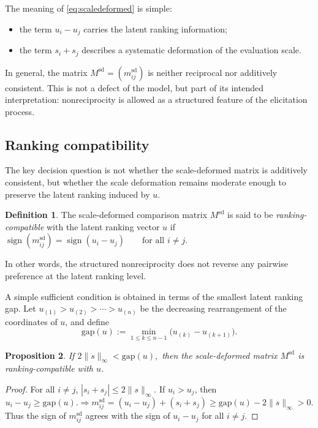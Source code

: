 \documentclass[11pt]{amsart}
\theoremstyle{definition}
\newtheorem{definition}{Definition}[section]
\theoremstyle{plain}
\newtheorem{proposition}[definition]{Proposition}
\numberwithin{equation}{section}
\begin{document}
The meaning of \eqref{eq:scaledeformed} is simple:
\begin{itemize}
\item the term $u_i-u_j$ carries the latent ranking information;
\item the term $s_i+s_j$ describes a systematic deformation of the evaluation scale.
\end{itemize}

In general, the matrix $M^{\mathrm{sd}}=(m_{ij}^{\mathrm{sd}})$ is neither reciprocal nor additively consistent. This is not a defect of the model, but part of its intended interpretation: nonreciprocity is allowed as a structured feature of the elicitation process.

\subsection{Ranking compatibility}

The key decision question is not whether the scale-deformed matrix is additively consistent, but whether the scale deformation remains moderate enough to preserve the latent ranking induced by $u$.

\begin{definition}
The scale-deformed comparison matrix $M^{\mathrm{sd}}$ is said to be \emph{ranking-compatible} with the latent ranking vector $u$ if
\(
\operatorname{sign}(m_{ij}^{\mathrm{sd}})
=
\operatorname{sign}(u_i-u_j)
\qquad
\text{for all } i\neq j.
\)
\end{definition}

In other words, the structured nonreciprocity does not reverse any pairwise preference at the latent ranking level.

A simple sufficient condition is obtained in terms of the smallest latent ranking gap. Let
\(
u_{(1)}>u_{(2)}>\cdots>u_{(n)}
\)
be the decreasing rearrangement of the coordinates of $u$, and define
\[
\mathrm{gap}(u):=\min_{1\le k\le n-1}\bigl(u_{(k)}-u_{(k+1)}\bigr).
\]

\begin{proposition}
If
\(
2\|s\|_\infty<\mathrm{gap}(u),
\)
then the scale-deformed matrix $M^{\mathrm{sd}}$ is ranking-compatible with $u$.
\end{proposition}

\begin{proof}
For all $i\neq j$,
\(
|s_i+s_j|\le 2\|s\|_\infty.
\)
If $u_i>u_j$, then
\[
u_i-u_j\ge \mathrm{gap}(u).
\Rightarrow
m_{ij}^{\mathrm{sd}}
=
(u_i-u_j)+(s_i+s_j)
\ge
\mathrm{gap}(u)-2\|s\|_\infty
>
0.
\]
Thus the sign of $m_{ij}^{\mathrm{sd}}$ agrees with the sign of $u_i-u_j$ for all $i\neq j$.
\end{proof}
\end{document}
